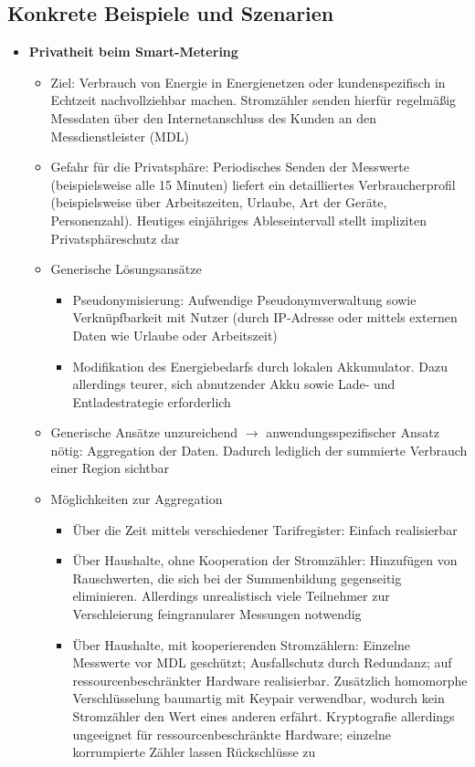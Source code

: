 \subsection{Konkrete Beispiele und Szenarien}
\begin{itemize}
	\item \textbf{Privatheit beim Smart-Metering}
	\begin{itemize}
		\item Ziel: Verbrauch von Energie in Energienetzen oder kundenspezifisch in Echtzeit nachvollziehbar machen. Stromzähler senden hierfür regelmäßig Messdaten über den Internetanschluss des Kunden an den Messdienstleister (MDL)
		\item Gefahr für die Privatsphäre: Periodisches Senden der Messwerte (beispielsweise alle 15 Minuten) liefert ein detailliertes Verbraucherprofil (beispielsweise über Arbeitszeiten, Urlaube, Art der Geräte, Personenzahl). Heutiges einjähriges Ableseintervall stellt impliziten Privatsphäreschutz dar
		\item Generische Lösungsansätze
		\begin{itemize}
			\item Pseudonymisierung: Aufwendige Pseudonymverwaltung sowie Verknüpfbarkeit mit Nutzer (durch IP-Adresse oder mittels externen Daten wie Urlaube oder Arbeitszeit)
			\item Modifikation des Energiebedarfs durch lokalen Akkumulator. Dazu allerdings teurer, sich abnutzender Akku sowie Lade- und Entladestrategie erforderlich
		\end{itemize}
		\item Generische Ansätze unzureichend \(\rightarrow\) anwendungsspezifischer Ansatz nötig: Aggregation der Daten. Dadurch lediglich der summierte Verbrauch einer Region sichtbar
		\item Möglichkeiten zur Aggregation
		\begin{itemize}
			\item Über die Zeit mittels verschiedener Tarifregister: Einfach realisierbar
			\item Über Haushalte, ohne Kooperation der Stromzähler: Hinzufügen von Rauschwerten, die sich bei der Summenbildung gegenseitig eliminieren. Allerdings unrealistisch viele Teilnehmer zur Verschleierung feingranularer Messungen notwendig
			\item Über Haushalte, mit kooperierenden Stromzählern: Einzelne Messwerte vor MDL geschützt; Ausfallschutz durch Redundanz; auf ressourcenbeschränkter Hardware realisierbar. Zusätzlich homomorphe Verschlüsselung baumartig mit Keypair verwendbar, wodurch kein Stromzähler den Wert eines anderen erfährt. Kryptografie allerdings ungeeignet für ressourcenbeschränkte Hardware; einzelne korrumpierte Zähler lassen Rückschlüsse zu

\end{itemize}
\end{itemize}
\end{itemize}
